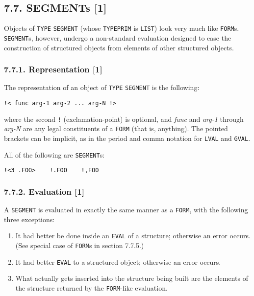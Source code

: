 \documentclass[a4paper,]{article}
\providecommand{\tightlist}{%
  \setlength{\itemsep}{0pt}\setlength{\parskip}{0pt}}
\begin{document}
\subsection{7.7. SEGMENTs {[}1{]}}\label{segments-1}

Objects of \texttt{TYPE} \texttt{SEGMENT} (whose \texttt{TYPEPRIM} is \texttt{LIST}) look
very much like \texttt{FORM}s. \texttt{SEGMENT}s, however, undergo a non-standard evaluation designed to ease the
construction of structured objects from elements of other structured objects.

\subsubsection{7.7.1. Representation {[}1{]}}\label{representation-1-2}

The representation of an object of \texttt{TYPE} \texttt{SEGMENT} is the following:

\begin{verbatim}
!< func arg-1 arg-2 ... arg-N !>
\end{verbatim}

 where the second \texttt{!} (exclamation-point) is optional, and
\emph{func} and \emph{arg-1} through \emph{arg-N} are any legal constituents of a \texttt{FORM} (that is, anything). The
pointed brackets can be implicit, as in the period and comma notation for \texttt{LVAL} and \texttt{GVAL}.

All of the following are \texttt{SEGMENT}s:

\begin{verbatim}
!<3 .FOO>    !.FOO    !,FOO
\end{verbatim}


\subsubsection{7.7.2. Evaluation {[}1{]}}\label{evaluation-1-1}

A \texttt{SEGMENT} is evaluated in exactly the same manner as a \texttt{FORM}, with the following three exceptions:

\begin{enumerate}
\def\labelenumi{\arabic{enumi}.}
\tightlist
\item
  It had better be done inside an \texttt{EVAL} of a structure; otherwise an error occurs. (See special case of
  \texttt{FORM}s in section 7.7.5.)
\item
  It had better \texttt{EVAL} to a structured object; otherwise an error occurs.
\item
  What actually gets inserted into the structure being built are the elements of the structure returned by the
  \texttt{FORM}-like evaluation.
\end{enumerate}
\end{document}
